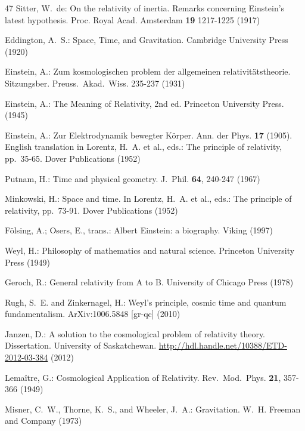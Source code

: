 \documentclass[11pt]{article}
\begin{document}
\begin{thebibliography}{47}
 Sitter, W.~de: On the relativity of inertia. Remarks concerning Einstein's latest hypothesis. Proc. Royal Acad. Amsterdam \textbf{19} 1217-1225 (1917)

 Eddington, A.~S.: Space, Time, and Gravitation. Cambridge University Press (1920)

 Einstein, A.: Zum kosmologischen problem der allgemeinen relativit\"{a}tstheorie. Sitzungsber. Preuss.\ Akad.\ Wiss. 235-237 (1931)

 Einstein, A.: The Meaning of Relativity, 2nd ed. Princeton University Press. (1945)

 Einstein, A.: Zur Elektrodynamik bewegter K\"{o}rper. Ann. der Phys. \textbf{17} (1905). English translation in Lorentz, {H.~A.} et al., eds.: The principle of relativity, pp.~35-65. Dover Publications (1952)


 Putnam, H.: Time and physical geometry. J.\ Phil. \textbf{64}, 240-247 (1967)

 Minkowski, H.: Space and time. In Lorentz, {H.~A.} et al., eds.: The principle of relativity, pp.~73-91. Dover Publications (1952) 

 F\"{o}lsing, A.; Osers, E., trans.: Albert Einstein: a biography. Viking (1997)

 Weyl, H.: Philosophy of mathematics and natural science. Princeton University Press (1949)

 Geroch, R.: General relativity from A to B. University of Chicago Press (1978)

 Rugh, S.~E. and Zinkernagel, H.: Weyl's principle, cosmic time and quantum fundamentalism. ArXiv:1006.5848 [gr-qc] (2010)

 Janzen, D.: A solution to the cosmological problem of relativity theory. Dissertation. University of Saskatchewan. \url{http://hdl.handle.net/10388/ETD-2012-03-384} (2012)

 Lema{\^i}tre, G.: Cosmological Application of Relativity. Rev.\ Mod.\ Phys. \textbf{21}, 357-366 (1949)

 Misner, C.~W., Thorne, K.~S., and Wheeler, J.~A.: Gravitation. W.~H. Freeman and Company (1973)


\end{thebibliography}
\end{document}
